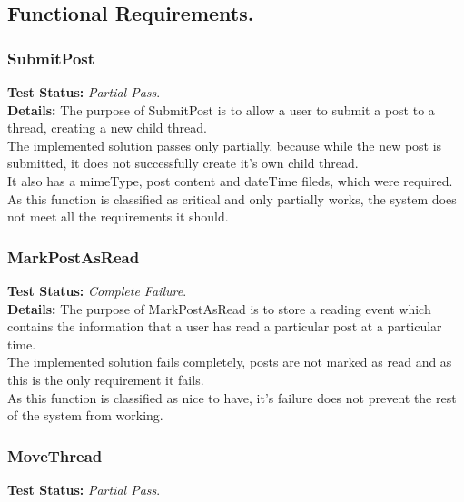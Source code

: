 \subsection{Functional Requirements.}
\begin{flushleft}

\subsubsection{SubmitPost}
\begin{flushleft}
	\textbf{Test Status:} \emph{Partial Pass}. \\

	\textbf{Details:}
	The purpose of SubmitPost is to allow a user to submit a post to a thread, creating a new child thread.\\
	The implemented solution passes only partially, because while the new post is submitted, it does not successfully create it's own child thread.\\
	It also has a mimeType, post content and dateTime fileds, which were required.\\
	As this function is classified as critical and only partially works, the system does not meet all the requirements it should.\\
\end{flushleft}

\subsubsection{MarkPostAsRead}
\begin{flushleft}
	\textbf{Test Status:} \emph{Complete Failure}. \\

	\textbf{Details:}
	The purpose of MarkPostAsRead is to store a reading event which contains the information that a user has read a particular post at a particular time.\\
	The implemented solution fails completely, posts are not marked as read and as this is the only requirement it fails.\\
	
	As this function is classified as nice to have, it's failure does not prevent the rest of the system from working.\\
  
\end{flushleft}

\subsubsection{MoveThread}
\begin{flushleft}
	\textbf{Test Status:} \emph{Partial Pass}. \\


\end{flushleft}
\end{flushleft}
